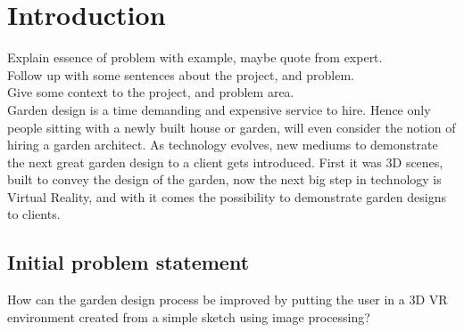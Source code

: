 \chapter{Introduction}
	
	Explain essence of problem with example, maybe quote from expert.\\
	Follow up with some sentences about the project, and problem.\\
	Give some context to the project, and problem area.\\
	
	Garden design is a time demanding and expensive service to hire. Hence only people sitting with a newly built house or garden, will even consider the notion of hiring a garden architect. As technology evolves, new mediums to demonstrate the next great garden design to a client gets introduced\cite{landscapeArchitectureDigiTech}. First it was 3D scenes, built to convey the design of the garden, now the next big step in technology is Virtual Reality\cite{VRS}, and with it comes the possibility to demonstrate garden designs to clients.
	
	\section{Initial problem statement}
	How can the garden design process be improved by putting the user in a 3D VR environment created from a simple sketch using image processing?
	